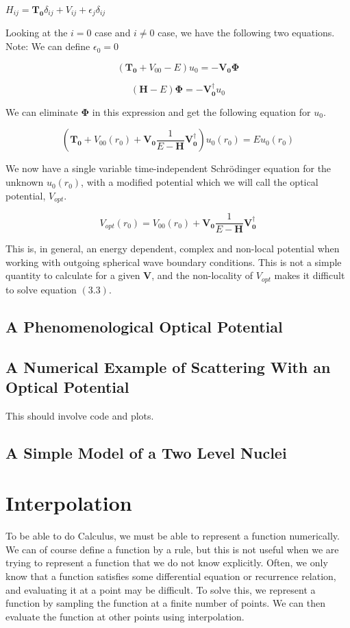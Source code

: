 \documentclass[12pt,letterpaper]{article}
\numberwithin{equation}{section}
\newcommand{\beq}{\begin{equation}}
\newcommand{\eeq}{\end{equation}}
\begin{document}
\begin{center}
$H_{ij} = \boldsymbol{T_0}\delta_{ij} + V_{ij} + \epsilon_j\delta_{ij}$
\end{center}

\noindent Looking at the  $i = 0$ case and $i \neq 0$ case, we have the following two equations.
\newline
Note: We can define $\epsilon_0 = 0$

\beq
(\boldsymbol{T_0} + V_{00} - E)u_0 = -\boldsymbol{V_0}\boldsymbol{\Phi}
\eeq

\beq
(\boldsymbol{H} - E)\boldsymbol{\Phi} = -\boldsymbol{V_0^\dagger}u_0
\eeq

\noindent We can eliminate $\boldsymbol{\Phi}$ in this expression and get the following equation for $u_0$.

\beq
(\boldsymbol{T_0} + V_{00}(r_0) + \boldsymbol{V_0} \frac{1}{E - \boldsymbol{H}} \boldsymbol{V_0^\dagger})u_0(r_0) = Eu_0(r_0)
\eeq

We now have a single variable time-independent Schrödinger equation for the unknown $u_0(r_0)$, with a modified potential which we will call the optical potential, $V_{opt}$.

\beq
V_{opt}(r_0) = V_{00}(r_0) + \boldsymbol{V_0} \frac{1}{E - \boldsymbol{H}} \boldsymbol{V_0^\dagger}
\eeq

This is, in general, an energy dependent, complex and non-local potential when working with outgoing spherical wave boundary conditions. This is not a simple quantity to calculate for a given $\boldsymbol{V}$, and the non-locality of $V_{opt}$ makes it difficult to solve equation $(3.3)$. 

\subsection{A Phenomenological Optical Potential}

\subsection{A Numerical Example of Scattering With an Optical Potential}
This should involve code and plots.

\subsection{A Simple Model of a Two Level Nuclei}

\newpage
\appendix

\section{Interpolation}
To be able to do Calculus, we must be able to represent a function numerically. We can of course define a function by a rule, but this is not useful when we are trying to represent a function that we do not know explicitly. Often, we only know that a function satisfies some differential equation or recurrence relation, and evaluating it at a point may be difficult. To solve this, we represent a function by sampling the function at a finite number of points. We can then evaluate the function at other points using interpolation.
\end{document}

